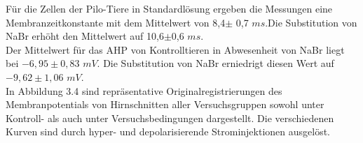 \documentclass[a4paper,11pt]{report}
\begin{document}
{Für die Zellen der Pilo-Tiere in Standardlösung ergeben die Messungen eine Membranzeitkonstante mit dem Mittelwert von 8,4$\pm$ 0,7 $ms$.Die Substitution von NaBr erhöht den Mittelwert auf 10,6$\pm$0,6 $ms$.\\



Der Mittelwert für das AHP von Kontrolltieren in Abwesenheit von NaBr liegt bei $-6,95 \pm 0,83$ $mV$. Die Substitution von NaBr erniedrigt diesen Wert auf $-9,62 \pm 1,06$ $mV$.\\

In Abbildung 3.4 sind repräsentative Originalregistrierungen des Membranpotentials von Hirnschnitten aller Versuchsgruppen sowohl unter Kontroll- als auch unter Versuchsbedingungen dargestellt. Die verschiedenen Kurven sind durch hyper- und depolarisierende Strominjektionen ausgelöst.

\begin{figure} [H]
\begin{center}


\end{center}
\end{figure}}
\end{document}
